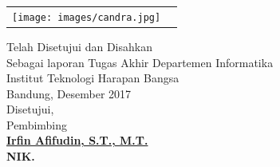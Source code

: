 \begin{center}   
\begin{tabular}{ p{4.5cm}  p{5.5cm}}
 \texttt{[image: images/candra.jpg]} &
\vspace{-4cm}{Disusun oleh:\newline Nama: Edric Laksa Putra\newline NIM	: 1114065}

\end{tabular}
\end{center}
\doublespacing
{\center
\vspace{1cm}
Telah Disetujui dan Disahkan\\ Sebagai laporan Tugas Akhir Departemen Informatika\\
Institut Teknologi Harapan Bangsa\\[0.5cm]
Bandung,   Desember 2017\\
Disetujui,\\[0.5cm]
Pembimbing\\[2cm]
\bfseries 
{\underline {Irfin Afifudin, S.T., M.T.}\\
NIK. \\}}